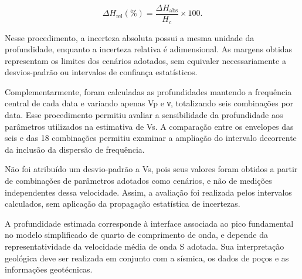 \begin{equation}
  \Delta H_{\mathrm{rel}}(\%)=\frac{\Delta H_{\mathrm{abs}}}{H_c}\times100.
  \label{eq:semi-amplitude-relativa}
\end{equation}

Nesse procedimento, a incerteza absoluta possui a mesma unidade da profundidade, enquanto a incerteza relativa é adimensional. As margens obtidas representam os limites dos cenários adotados, sem equivaler necessariamente a desvios-padrão ou intervalos de confiança estatísticos.

Complementarmente, foram calculadas as profundidades mantendo a frequência central de cada data e variando apenas Vp e ν, totalizando seis combinações por data. Esse procedimento permitiu avaliar a sensibilidade da profundidade aos parâmetros utilizados na estimativa de Vs. A comparação entre os envelopes das seis e das 18 combinações permitiu examinar a ampliação do intervalo decorrente da inclusão da dispersão de frequência.

Não foi atribuído um desvio-padrão a Vs, pois seus valores foram obtidos a partir de combinações de parâmetros adotados como cenários, e não de medições independentes dessa velocidade. Assim, a avaliação foi realizada pelos intervalos calculados, sem aplicação da propagação estatística de incertezas.

A profundidade estimada corresponde à interface associada ao pico fundamental no modelo simplificado de quarto de comprimento de onda, e depende da representatividade da velocidade média de onda S adotada. Sua interpretação geológica deve ser realizada em conjunto com a sísmica, os dados de poços e as informações geotécnicas.
